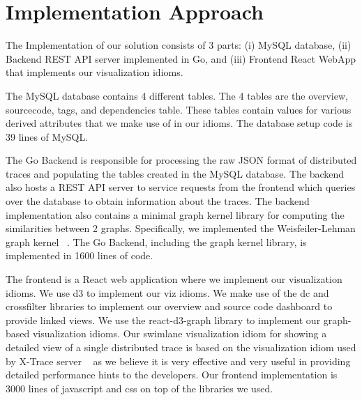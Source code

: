 \section{Implementation Approach}

The Implementation of our solution consists of 3 parts: (i) MySQL database, (ii) Backend REST API
server implemented in Go, and (iii) Frontend React WebApp that implements our visualization idioms.

The MySQL database contains 4 different tables. The 4 tables are the overview, sourcecode, tags,
and dependencies table. These tables contain values for various derived attributes
that we make use of in our idioms. The database setup code is 39 lines of MySQL.

The Go Backend is responsible for processing the raw JSON format of distributed traces
and populating the tables created in the MySQL database. The backend also
hosts a REST API server to service requests from the frontend which queries over the database
to obtain information about the traces. The backend implementation also contains
a minimal graph kernel library for computing the similarities between 2 graphs.
Specifically, we implemented the Weisfeiler-Lehman graph kernel ~\cite{shervashidze2011weisfeiler}.
The Go Backend, including the graph kernel library, is implemented in 1600 lines of code.

The frontend is a React web application where we implement our visualization idioms.
We use d3 to implement our viz idioms. We make use of the dc and crossfilter libraries
to implement our overview and source code dashboard to provide linked views. We use
the react-d3-graph library to implement our graph-based visualization idioms.
Our swimlane visualization idiom for showing a detailed view of a single distributed trace
is based on the visualization idiom used by
X-Trace server ~\cite{fonseca2007x, xtraceserver} as we believe it is very effective
and very useful in providing detailed performance hints to the developers.
Our frontend implementation is 3000 lines of javascript and css on top of
the libraries we used.